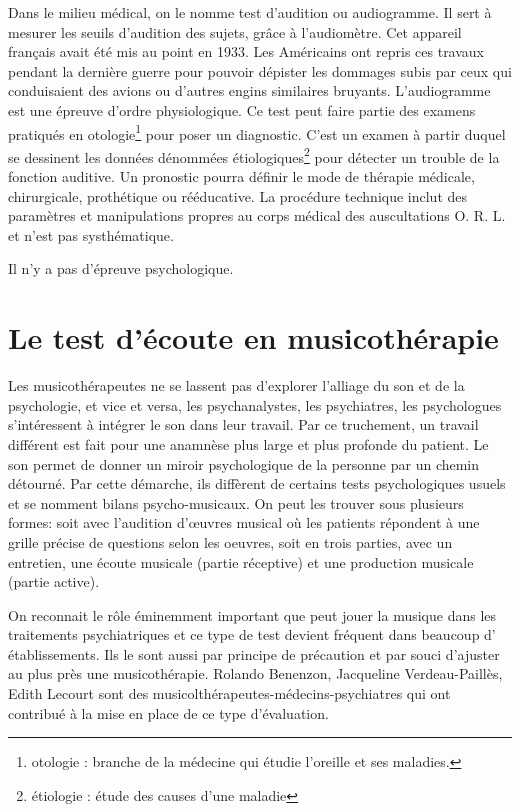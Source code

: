 Dans le milieu médical, on le nomme test d'audition ou audiogramme. Il
sert à mesurer les seuils d'audition des sujets, grâce à l'audiomètre. Cet 
appareil français avait été mis au point en 1933. Les Américains
ont repris ces travaux pendant la dernière guerre pour pouvoir dépister
les dommages subis par ceux qui conduisaient des avions ou d'autres
engins similaires bruyants.
  L'audiogramme est une épreuve d'ordre physiologique. Ce test peut faire partie des examens  pratiqués en otologie\footnote{otologie : branche de la médecine
  	qui étudie l'oreille et ses maladies.} pour poser un diagnostic. 
   C'est un examen à partir duquel se
  dessinent les données dénommées étiologiques\footnote{étiologie : étude des causes
  	d'une maladie} pour détecter un trouble de la fonction auditive. Un pronostic pourra définir le mode de thérapie
médicale, chirurgicale, prothétique ou rééducative. La procédure
technique inclut des paramètres et manipulations propres au corps
médical des auscultations O. R. L. et  n'est pas systhématique.

Il n'y a pas d'épreuve psychologique. 




\section{Le test d'écoute en musicothérapie}

Les musicothérapeutes ne se lassent pas d'explorer l'alliage du son
 et de la psychologie, et vice
 et versa, les psychanalystes, les psychiatres, les psychologues
 s'intéressent à intégrer le son dans leur travail. Par ce truchement,
 un travail différent est fait pour une anamnèse plus large et
 plus profonde du patient. Le son permet de donner un miroir
 psychologique de la personne par un chemin détourné. Par cette
 démarche, ils diffèrent de certains tests psychologiques usuels
 et se nomment bilans psycho-musicaux. On peut les trouver sous
 plusieurs formes: soit avec l'audition d'\oe uvres
 musical où les patients répondent à une grille précise de questions
 selon les oeuvres, soit en trois parties, avec un entretien,
 une écoute musicale (partie réceptive) et une production musicale
 (partie active).

 
 On reconnait le rôle éminemment important que peut jouer la musique
 dans les traitements psychiatriques et ce type de test devient
 fréquent dans beaucoup d' établissements. Ils le sont aussi  par principe de précaution et
 par souci d'ajuster au plus près une
 musicothérapie. Rolando Benenzon, Jacqueline Verdeau-Paillès, Edith
 Lecourt sont des musicolthérapeutes-médecins-psychiatres qui ont contribué à la mise en place de ce
 type d'évaluation.

